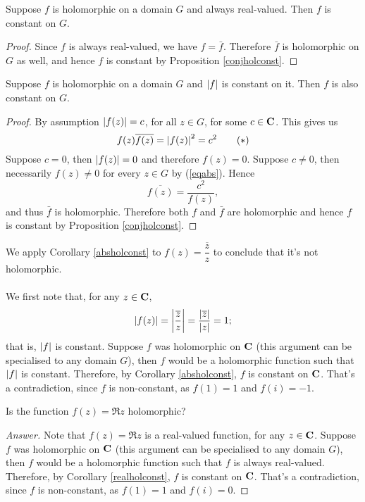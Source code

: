 \medskip

\begin{corollary}\label{realholconst}
Suppose $f$ is holomorphic on a domain $G$ and always real-valued. Then $f$ is constant on $G$.
\end{corollary}
\begin{proof}
Since $f$ is always real-valued, we have $f = \bar{f}$. Therefore $\bar{f}$ is holomorphic on $G$ as well, and hence $f$ is constant by Proposition \ref{conjholconst}.
\end{proof}

\medskip

\begin{corollary}\label{absholconst}
Suppose $f$ is holomorphic on a domain $G$ and $\left\lvert f\right\rvert$ is constant on it. Then $f$ is also constant on $G$.
\end{corollary}
\begin{proof}
By assumption $\left\lvert f(z)\right\rvert = c$, for all $z \in G$, for some $c \in \mathbf C$. This gives us
\[f(z)\overline{f(z)} = \left\lvert f(z)\right\rvert^2 = c^2\tag{$*$}\label{eqabs}\]
Suppose $c = 0$, then $\left\lvert f(z)\right\rvert = 0$ and therefore $f(z) = 0$. Suppose $c \neq 0$, then necessarily $f(z) \neq 0$ for every $z \in G$ by (\ref{eqabs}). Hence
\[\overline{f(z)} = \frac{c^2}{f(z)},\]
and thus $\bar{f}$ is holomorphic. Therefore both $f$ and $\bar{f}$ are holomorphic and hence $f$ is constant by Proposition \ref{conjholconst}.
\end{proof}

\medskip

\begin{example}
We apply Corollary \ref{absholconst} to $f(z) = \dfrac{\overline{z}}{z}$ to conclude that it's not holomorphic.\\
\\
We first note that, for any $z \in \mathbf C$,
\[\left\lvert f(z)\right\rvert = \left\lvert\frac{\overline{z}}{z}\right\rvert = \frac{|\overline{z}|}{\left\lvert z\right\rvert} = 1;\]
that is, $\left\lvert f\right\rvert$ is constant. Suppose $f$ was holomorphic on $\mathbf C$ (this argument can be specialised to any domain $G$), then $f$ would be a holomorphic function such that $\left\lvert f\right\rvert$ is constant. Therefore, by Corollary \ref{absholconst}, $f$ is constant on $\mathbf C$. That's a contradiction, since $f$ is non-constant, as $f(1) = 1$ and $f(i) = -1$. 
\end{example}

\medskip

\begin{example}[in-class]
Is the function $f(z) = \Re z$ holomorphic?
\end{example}
\begin{proof}[Answer]
Note that $f(z) = \Re z$ is a real-valued function, for any $z \in \mathbf C$. Suppose $f$ was holomorphic on $\mathbf C$ (this argument can be specialised to any domain $G$), then $f$ would be a holomorphic function such that $f$ is always real-valued. Therefore, by Corollary \ref{realholconst}, $f$ is constant on $\mathbf C$. That's a contradiction, since $f$ is non-constant, as $f(1) = 1$ and $f(i) = 0$. 
\end{proof}

